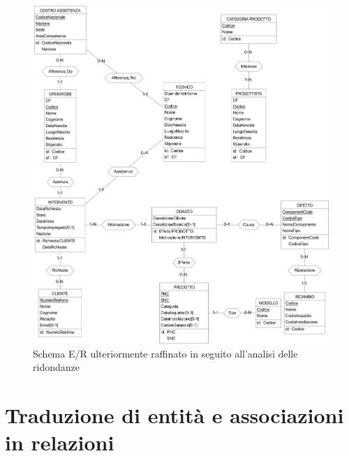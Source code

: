 \documentclass[a4paper, 12pt]{report}
\begin{document}
\begin{figure}[H]
	\centering
	\includegraphics[width=\linewidth]{images/Unredundant.png}
	\caption{Schema E/R ulteriormente raffinato in seguito all'analisi delle ridondanze}
\end{figure}

\section{Traduzione di entità e associazioni in relazioni}
\end{document}
